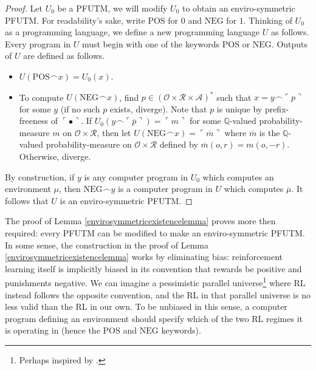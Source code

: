 \documentclass{article}
\begin{document}
\begin{proof}
    Let $U_0$ be a PFUTM, we will modify $U_0$ to obtain an enviro-symmetric PFUTM.
    For readability's sake, write $\mathrm{POS}$ for $0$ and $\mathrm{NEG}$ for $1$.
    Thinking of $U_0$ as a programming language, we define a new programming language
    $U$ as follows. Every program in $U$ must begin with one of the keywords
    $\mathrm{POS}$ or $\mathrm{NEG}$. Outputs of $U$ are defined as follows.
    \begin{itemize}
        \item $U(\mathrm{POS}\frown x)=U_0(x)$.
        \item To compute $U(\mathrm{NEG}\frown x)$, find
        $p\in (\mathcal O\times \mathcal R\times\mathcal A)^*$ such that
        $x=y\frown \ulcorner p\urcorner$ for some $y$ (if no such $p$ exists, diverge).
        Note that $p$ is unique by prefix-freeness of $\ulcorner\bullet\urcorner$.
        If $U_0(y\frown \ulcorner \overline p\urcorner)=\ulcorner m\urcorner$
        for some $\mathbb Q$-valued probability-measure $m$ on
        $\mathcal O\times\mathcal R$, then let
        $U(\mathrm{NEG}\frown x)=\ulcorner \overline m\urcorner$ where $\overline m$
        is the $\mathbb Q$-valued probability-measure on
        $\mathcal O\times\mathcal R$ defined by $\overline m(o,r)=m(o,-r)$.
        Otherwise, diverge.
    \end{itemize}
    By construction, if $y$ is any computer program in $U_0$ which computes
    an environment $\mu$, then $\mathrm{NEG}\frown y$ is a computer program in
    $U$ which computes $\overline\mu$. It follows that $U$ is an enviro-symmetric
    PFUTM.
\end{proof}

The proof of Lemma \ref{envirosymmetricexistencelemma} proves more then required:
every PFUTM can be modified to make an enviro-symmetric PFUTM. In some sense,
the construction in the proof of Lemma \ref{envirosymmetricexistencelemma} works
by eliminating bias: reinforcement learning itself is implicitly biased in its
convention that rewards be positive and punishments negative. We can imagine
a pessimistic parallel universe\footnote{Perhaps inspired by \cite{foucault2012discipline}.}
where RL instead follows the opposite convention, and the
RL in that parallel universe is no less valid than the RL in our own. To be
unbiased in this sense, a computer program defining an environment
should specify which of the two RL regimes it is operating in (hence the
$\mathrm{POS}$ and $\mathrm{NEG}$ keywords).
\end{document}
